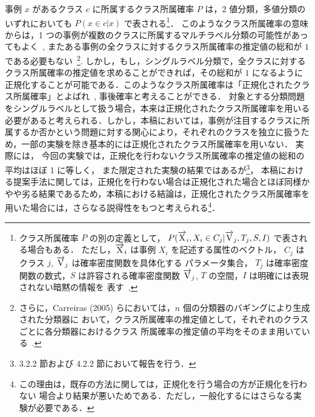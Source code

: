 \documentclass[japanese]{jnlp_1.4}
\begin{document}
事例 $x$ があるクラス $c$ に所属するクラス所属確率 $P$ は，2 値分類，多値分類のいずれにおいても $P(x \in{c}|x)$ で表される\footnote{
	クラス所属確率 $P$ の別の定義として，
	$P(\overrightarrow{\rm X}_{i},X_{i}\in{C_{j}}|\overrightarrow{\rm V}_{j},T_{j},S,I)$ 
	で表される場合もある．
	ただし，$\overrightarrow{\rm X}_{i}$ は事例 $X_{i}$ を記述する属性のベクトル，
	$C_{j}$ はクラス $j$, $\overrightarrow{\rm V}_{j}$ は確率密度関数を具体化する
	パラメータ集合，
	$T_{j}$ は確率密度関数の数式，$S$ は許容される確率密度関数 
	$\overrightarrow{\rm V}_{j}$, $T$ の空間，$I$ は明確には表現されない暗黙の情報を
	表す~\cite{Cheeseman96}.
}．
このようなクラス所属確率の意味からは，1 つの事例が複数のクラスに所属するマルチラベル分類の可能性があってもよく~\cite{erosheva05}, 
またある事例の全クラスに対するクラス所属確率の推定値の総和が $1$ 
である必要もない~\cite{Canters02}\footnote{
	さらに，Carreiras (2005) らにおいては，$n$ 個の分類器のバギングにより生成された分類器に
	おいて，クラス所属確率の推定値として，それぞれのクラスごとに各分類器におけるクラス
	所属確率の推定値の平均をそのまま用いている~\cite{Carreiras05}.
}. 
しかし，もし，シングルラベル分類で，全クラスに対するクラス所属確率の推定値を求めることができれば，その総和が $1$ になるように正規化することが可能である．このようなクラス所属確率は「正規化されたクラス所属確率」とよばれ~\cite{Cheeseman96}, 
事後確率と考えることができる．
対象とする分類問題をシングルラベルとして扱う場合，本来は正規化されたクラス所属確率を用いる必要があると考えられる．しかし，本稿においては，事例が注目するクラスに所属するか否かという問題に対する関心により，それぞれのクラスを独立に扱うため，一部の実験を除き基本的には正規化されたクラス所属確率を用いない．
実際には，
今回の実験では，正規化を行わないクラス所属確率の推定値の総和の平均はほぼ 1 に等しく，
また限定された実験の結果ではあるが\footnote{
	3.2.2 節および 4.2.2 節において報告を行う．
}，
本稿における提案手法に関しては，正規化を行わない場合は正規化された場合とほぼ同様かやや劣る結果であるため，本稿における結論は，正規化されたクラス所属確率を用いた場合には，さらなる説得性をもつと考えられる\footnote{
	この理由は，既存の方法に関しては，正規化を行う場合の方が正規化を行わない
	場合より結果が悪いためである．ただし，一般化するにはさらなる実験が必要である．
}．
\end{document}
